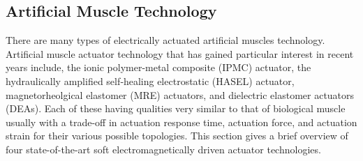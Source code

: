 \subsection{Artificial Muscle Technology}
There are many types of electrically actuated artificial muscles technology. Artificial muscle actuator technology that has gained particular interest in recent years include, the ionic polymer-metal composite (IPMC) actuator, the hydraulically amplified self‐healing electrostatic (HASEL) actuator, magnetorheolgical elastomer (MRE) actuators, and dielectric elastomer actuators (DEAs). Each of these having qualities very similar to that of biological muscle usually with a trade-off in actuation response time, actuation force, and actuation strain for their various possible topologies. This section gives a brief overview of four state-of-the-art soft electromagnetically driven actuator technologies.

